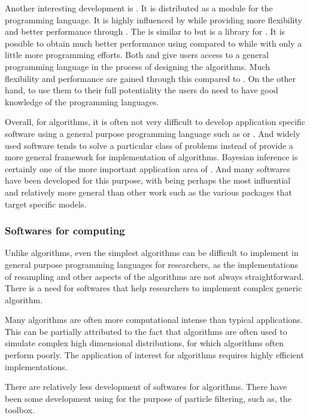 Another interesting development is \pymc \cite{pymc}. It is distributed as a
module for the \python programming language. It is highly influenced by \bugs
while providing more flexibility and better performance through \python. The
\cppbugs \cite{cppbugs} is similar to \pymc but is a library for \cpp. It is
possible to obtain much better performance using \cppbugs compared to \bugs
while with only a little more programming efforts. Both \pymc and \cppbugs
give users access to a general programming language in the process of
designing the algorithms. Much flexibility and performance are gained through
this compared to \bugs. On the other hand, to use them to their full
potentiality the users do need to have good knowledge of the programming
languages.

Overall, for \mcmc algorithms, it is often not very difficult to develop
application specific software using a general purpose programming language
such as \rlang or \cpp. And widely used software tends to solve a particular
class of problems instead of provide a more general framework for
implementation of algorithms. Bayesian inference is certainly one of the more
important application area of \mcmc. And many softwares have been developed
for this purpose, with \bugs being perhaps the most influential and relatively
more general than other work such as the various \rlang packages that target
specific models.

\subsubsection{Softwares for \protect\smc computing}
\label{ssub:Softwares for smc computing}

Unlike \mcmc algorithms, even the simplest \smc algorithms can be difficult to
implement in general purpose programming languages for researchers, as the
implementations of resampling and other aspects of the algorithms are not
always straightforward. There is a need for softwares that help researchers to
implement complex generic \smc algorithm.

Many \smc algorithms are often more computational intense than typical \mcmc
applications. This can be partially attributed to the fact that \smc
algorithms are often used to simulate complex high dimensional distributions,
for which \mcmc algorithms often perform poorly. The application of interest
for \smc algorithms requires highly efficient implementations.

There are relatively less development of softwares for \smc algorithms. There
have been some development using \matlab for the purpose of particle
filtering, such as, the \pflib \cite{pflib} toolbox.

